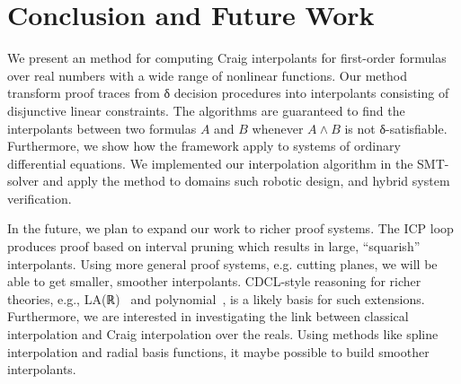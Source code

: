 \section{Conclusion and Future Work}
\label{sec:concl}

We present an method for computing Craig interpolants for first-order formulas over real numbers with a wide range of nonlinear functions.
Our method transform proof traces from δ decision procedures into interpolants consisting of disjunctive linear constraints.
The algorithms are guaranteed to find the interpolants between two formulas $A$ and $B$ whenever $A ∧ B$ is not δ-satisfiable.
Furthermore, we show how the framework apply to systems of ordinary differential equations.
We implemented our interpolation algorithm in the \dReal SMT-solver and apply the method to domains such robotic design, and hybrid system verification.  

In the future, we plan to expand our work to richer proof systems.
The ICP loop produces proof based on interval pruning which results in large, ``squarish'' interpolants.
Using more general proof systems, e.g. cutting planes, we will be able to get smaller, smoother interpolants.
CDCL-style reasoning for richer theories, e.g., LA(ℝ)~\cite{DBLP:conf/cav/McMillanKS09} and polynomial~\cite{DBLP:conf/cade/JovanovicM12}, is a likely basis for such extensions.
Furthermore, we are interested in investigating the link between classical interpolation and Craig interpolation over the reals.
Using methods like spline interpolation and radial basis functions, it maybe possible to build smoother interpolants.
